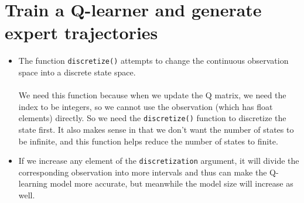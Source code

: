 \documentclass{article}
\begin{document}
    \section{Train a Q-learner and generate expert trajectories}
    \begin{itemize}
    	\item 
    	The function \verb|discretize()| attempts to change the continuous observation space into a discrete state space.\\\\
    	We need this function because when we update the Q matrix, we need the index to be integers, so we cannot use the observation (which has float elements) directly. So we need the \verb|discretize()| function to discretize the state first. It also makes sense in that we don't want the number of states to be infinite, and this function helps reduce the number of states to finite. 
    	\item
    	If we increase any element of the \verb|discretization| argument, it will divide the corresponding observation into more intervals and thus can make the Q-learning model more accurate, but meanwhile the model size will increase as well.
    \end{itemize}   
    
\end{document}
